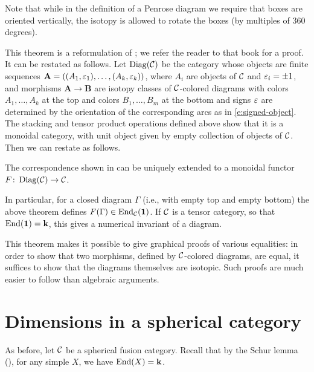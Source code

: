 Note that while in the definition of a Penrose diagram we require that boxes
are oriented vertically, the isotopy is allowed to rotate the boxes (by
multiples of 360 degrees).

This theorem is a reformulation of \cite[Theorem 2.6]{turaev-virelizier}; we
refer the reader to that book for a proof. It can
be restated as follows. Let $\operatorname{Diag}(\mathcal{C})$ be the category whose objects are finite
sequences $\mathbf{A}=((A_1, \varepsilon_1), \dots, (A_k, \varepsilon_k))$, where $A_i$ are
objects of $\mathcal{C}$ and $\varepsilon_i=\pm 1$, and morphisms $\mathbf{A}\to \mathbf{B}$
are isotopy classes of $\mathcal{C}$-colored diagrams with colors $A_1, \dots, A_k$ at
the top and colors $B_1, \dots, B_m$ at the bottom and signs $\varepsilon$ are
determined by the orientation of the corresponding arcs as in
\eqref{e:signed-object}. The stacking and tensor product operations defined
above show that it is a monoidal category, with unit object given by empty
collection of objects of $\mathcal{C}$. Then we can restate
 as follows.

\begin{theorem}\label{t:graphical-calculus2}
  The correspondence shown in  can be uniquely extended to
  a monoidal functor $F\colon \operatorname{Diag}(\mathcal{C})\to \mathcal{C}$.
\end{theorem}


In particular, for a closed diagram $\Gamma$ (i.e., with empty top and empty
bottom) the above theorem defines $F(\Gamma)\in \operatorname{End}_{\mathcal{C}}(\mathbf{1})$. If $\mathcal{C}$
is a tensor category, so that $\operatorname{End}(\mathbf{1})=\mathbf{k}$, this gives a numerical invariant
of a diagram.

This theorem makes it possible to give graphical proofs of various equalities:
in order to show that two morphisms, defined by $\mathcal{C}$-colored diagrams, are
equal, it suffices to show that the diagrams themselves are isotopic. Such
proofs are much easier to follow than algebraic arguments.






\section{Dimensions in a spherical category}\label{s:spherical-basic}

As before, let $\mathcal{C}$ be a spherical fusion category.
Recall that by the Schur lemma (),
for any simple $X$, we have $\operatorname{End}(X)=\mathbf{k}$.

